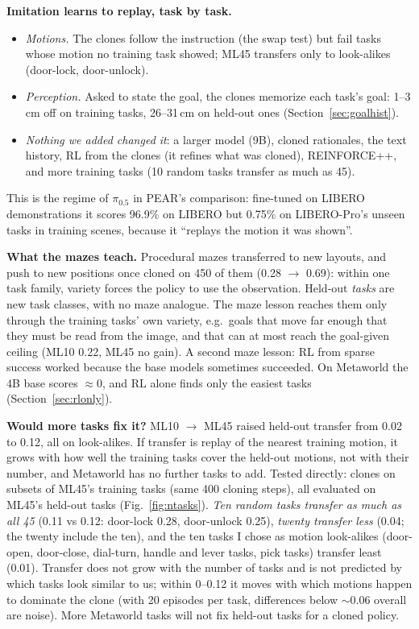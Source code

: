 \documentclass[11pt]{article}
\begin{document}
\textbf{Imitation learns to replay, task by task.}
\begin{itemize}
\item \emph{Motions.} The clones follow the instruction (the swap test) but fail tasks whose motion no training task
  showed; ML45 transfers only to look-alikes (door-lock, door-unlock).
\item \emph{Perception.} Asked to state the goal, the clones memorize each task's goal: 1--3\,cm off on training tasks,
  26--31\,cm on held-out ones (Section~\ref{sec:goalhist}).
\item \emph{Nothing we added changed it}: a larger model (9B), cloned rationales, the text history, RL from the clones
  (it refines what was cloned), REINFORCE++, and more training tasks (10 random tasks transfer as much as 45).
\end{itemize}
This is the regime of $\pi_{0.5}$ in PEAR's comparison: fine-tuned on LIBERO demonstrations it scores 96.9\% on LIBERO
but 0.75\% on LIBERO-Pro's unseen tasks in training scenes, because it ``replays the motion it was shown''.

\textbf{What the mazes teach.} Procedural mazes transferred to new layouts, and push to new positions once cloned on
450 of them (0.28 $\to$ 0.69): within one task family, variety forces the policy to use the observation. Held-out
\emph{tasks} are new task classes, with no maze analogue. The maze lesson reaches them only through the training tasks'
own variety, e.g.\ goals that move far enough that they must be read from the image, and that can at most reach the
goal-given ceiling (ML10 0.22, ML45 no gain). A second maze lesson: RL from sparse success worked because the base
models sometimes succeeded. On Metaworld the 4B base scores $\approx$0, and RL alone finds only the easiest tasks
(Section~\ref{sec:rlonly}).

\textbf{Would more tasks fix it?} ML10 $\to$ ML45 raised held-out transfer from 0.02 to 0.12, all on look-alikes. If
transfer is replay of the nearest training motion, it grows with how well the training tasks cover the held-out
motions, not with their number, and Metaworld has no further tasks to add. Tested directly: clones on subsets of
ML45's training tasks (same 400 cloning steps), all evaluated on ML45's held-out tasks (Fig.~\ref{fig:ntasks}).
\emph{Ten random tasks transfer as much as all 45} (0.11 vs 0.12: door-lock 0.28, door-unlock 0.25), \emph{twenty
transfer less} (0.04; the twenty include the ten), and the ten tasks I chose as motion look-alikes (door-open, door-close,
dial-turn, handle and lever tasks, pick tasks) transfer least (0.01). Transfer does not grow with the number of tasks and
is not predicted by which tasks look similar to us; within 0--0.12 it moves with which motions happen to dominate the
clone (with 20 episodes per task, differences below $\sim$0.06 overall are noise). More Metaworld tasks will not fix
held-out tasks for a cloned policy.
\end{document}
